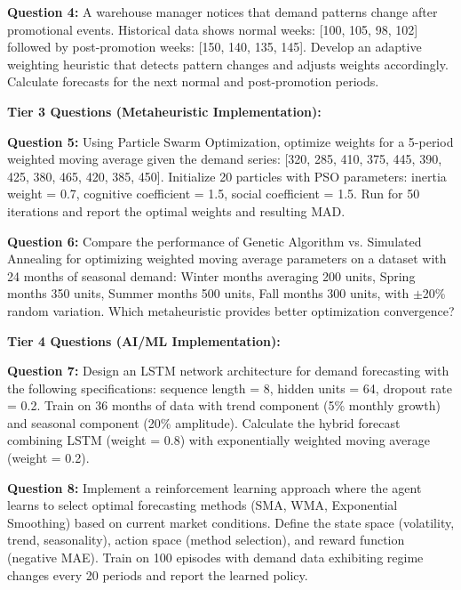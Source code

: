 \documentclass{article}
\begin{document}
\textbf{Question 4:} A warehouse manager notices that demand patterns change after promotional events. Historical data shows normal weeks: [100, 105, 98, 102] followed by post-promotion weeks: [150, 140, 135, 145]. Develop an adaptive weighting heuristic that detects pattern changes and adjusts weights accordingly. Calculate forecasts for the next normal and post-promotion periods.

\textbf{Tier 3 Questions (Metaheuristic Implementation):}

\textbf{Question 5:} Using Particle Swarm Optimization, optimize weights for a 5-period weighted moving average given the demand series: [320, 285, 410, 375, 445, 390, 425, 380, 465, 420, 385, 450]. Initialize 20 particles with PSO parameters: inertia weight = 0.7, cognitive coefficient = 1.5, social coefficient = 1.5. Run for 50 iterations and report the optimal weights and resulting MAD.

\textbf{Question 6:} Compare the performance of Genetic Algorithm vs. Simulated Annealing for optimizing weighted moving average parameters on a dataset with 24 months of seasonal demand: Winter months averaging 200 units, Spring months 350 units, Summer months 500 units, Fall months 300 units, with $\pm$20\% random variation. Which metaheuristic provides better optimization convergence?

\textbf{Tier 4 Questions (AI/ML Implementation):}

\textbf{Question 7:} Design an LSTM network architecture for demand forecasting with the following specifications: sequence length = 8, hidden units = 64, dropout rate = 0.2. Train on 36 months of data with trend component (5\% monthly growth) and seasonal component (20\% amplitude). Calculate the hybrid forecast combining LSTM (weight = 0.8) with exponentially weighted moving average (weight = 0.2).

\textbf{Question 8:} Implement a reinforcement learning approach where the agent learns to select optimal forecasting methods (SMA, WMA, Exponential Smoothing) based on current market conditions. Define the state space (volatility, trend, seasonality), action space (method selection), and reward function (negative MAE). Train on 100 episodes with demand data exhibiting regime changes every 20 periods and report the learned policy.
\end{document}
